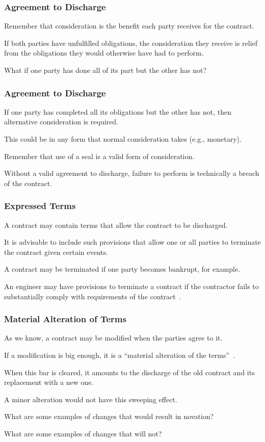 \begin{frame}
\frametitle{Agreement to Discharge}

Remember that consideration is the benefit each party receives for the contract.

If both parties have unfulfilled obligations, the consideration they receive is relief from the obligations they would otherwise have had to perform.

What if one party has done all of its part but the other has not?

\end{frame}



\begin{frame}
\frametitle{Agreement to Discharge}

If one party has completed all its obligations but the other has not, then alternative consideration is required.

This could be in any form that normal consideration takes (e.g., monetary).

Remember that use of a seal is a valid form of consideration.

Without a valid agreement to discharge, failure to perform is technically a breach of the contract.


\end{frame}



\begin{frame}
\frametitle{Expressed Terms}

A contract may contain terms that allow the contract to be discharged.

It is advisable to include such provisions that allow one or all parties to terminate the contract given certain events.

A contract may be terminated if one party becomes bankrupt, for example.

An engineer may have provisions to terminate a contract if the contractor fails to substantially comply with requirements of the contract~\cite{lpe}.


\end{frame}



\begin{frame}
\frametitle{Material Alteration of Terms}

As we know, a contract may be modified when the parties agree to it.

If a modification is big enough, it is a ``material alteration of the terms''~\cite{lba}.

When this bar is cleared, it amounts to the discharge of the old contract and its replacement with a new one.

A minor alteration would not have this sweeping effect.

What are some examples of changes that would result in novation?

What are some examples of changes that will not?

\end{frame}



